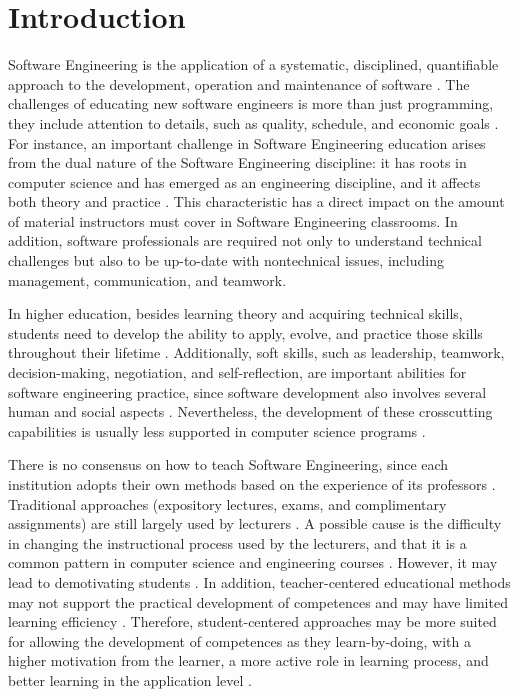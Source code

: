 \chapter{Introduction}
\label{ch:introduction}

Software Engineering is the application of a systematic, disciplined, quantifiable approach to the development, operation and maintenance of software \citep{Acm:2015}. The challenges of educating new software engineers is more than just programming, they include attention to details, such as quality, schedule, and economic goals \citep{Acm:2015}. For instance, an important challenge in Software Engineering education arises from the dual nature of the Software Engineering discipline: it has roots in computer science and has emerged as an engineering discipline, and it affects both theory and practice \citep{Acm:2015}. This characteristic has a direct impact on the amount of material instructors must cover in Software Engineering classrooms. In addition, software professionals are required not only to understand technical challenges but also to be up-to-date with nontechnical issues, including management, communication, and teamwork.

In higher education, besides learning theory and acquiring technical skills, students need to develop the ability to apply, evolve, and practice those skills throughout their lifetime \citep{Gary:2015}. Additionally, soft skills, such as leadership, teamwork, decision-making, negotiation, and self-reflection, are important abilities for software engineering practice, since software development also involves several human and social aspects \citep{Marques:2014}. Nevertheless, the development of these crosscutting capabilities is usually less supported in computer science programs \citep{Marques:2014}.

There is no consensus on how to teach Software Engineering, since each institution adopts their own methods based on the experience of its professors \citep{Marques:2014}. Traditional approaches (expository lectures, exams, and complimentary assignments) are still largely used by lecturers \citep{Marques:2014, Bessa:2012,Prikladnicki:2009}. A possible cause is the difficulty in changing the instructional process used by the lecturers, and that it is a common pattern in computer science and engineering courses \citep{Marques:2014}. However, it may lead to demotivating students \citep{Prikladnicki:2009,Bessa:2012, Barnes:2008}. In addition, teacher-centered educational methods may not support the practical development of competences \citep{Barnes:2008} and may have limited learning efficiency \citep{Prikladnicki:2009}. Therefore, student-centered approaches may be more suited for allowing the development of competences as they learn-by-doing, with a higher motivation from the learner, a more active role in learning process, and better learning in the application level \citep{Prikladnicki:2009}.

